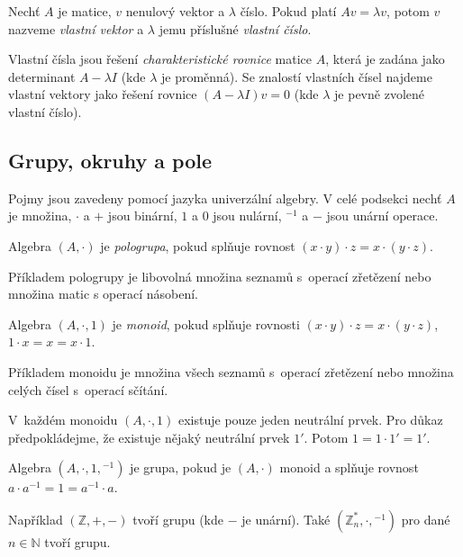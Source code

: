 \begin{definition}
    Nechť $A$ je matice, $v$ nenulový vektor a $\lambda$ číslo.
    Pokud platí $A v = \lambda v$, potom $v$ nazveme {\em vlastní
    vektor} a $\lambda$ jemu příslušné {\em vlastní číslo}.
\end{definition}

Vlastní čísla jsou řešení {\em charakteristické rovnice} matice $A$,
která je zadána jako determinant $A - \lambda I$ (kde $\lambda$ je
proměnná).
Se znalostí vlastních čísel najdeme vlastní vektory jako řešení rovnice
$(A - \lambda I) v = 0$ (kde $\lambda$ je pevně zvolené vlastní číslo).

\subsection{Grupy, okruhy a pole}

Pojmy jsou zavedeny pomocí jazyka univerzální algebry. V celé podsekci
nechť $A$ je množina, $\cdot$ a $+$ jsou binární, $1$ a $0$ jsou
nulární, ${^{-1}}$ a $-$ jsou unární operace.

\begin{definition}[Pologrupa]
    Algebra $(A, \cdot)$ je {\em pologrupa},
    pokud splňuje rovnost
    $(x \cdot y) \cdot z = x \cdot (y \cdot z)$.
\end{definition}

Příkladem pologrupy je libovolná množina seznamů s~operací zřetězení
nebo množina matic s operací násobení.

\begin{definition}[Monoid]
    Algebra $(A, \cdot, 1)$ je {\em monoid}, pokud
    splňuje rovnosti
    $(x \cdot y) \cdot z = x \cdot (y \cdot z)$,
    $1 \cdot x = x = x \cdot 1$.
\end{definition}

Příkladem monoidu je množina všech seznamů s~operací zřetězení nebo
množina celých čísel s~operací sčítání.

V~každém monoidu $(A, \cdot, 1)$ existuje pouze jeden neutrální
prvek. Pro důkaz předpokládejme, že existuje nějaký neutrální prvek $1'$.
Potom $1 = 1 \cdot 1' = 1'$.

\begin{definition}[Grupa]
    Algebra $(A, \cdot, 1, {^{-1}})$ je grupa, pokud
    je $(A, \cdot)$ monoid a splňuje rovnost $a \cdot a^{-1} = 1 = a^{-1} \cdot a$.
\end{definition}

Například $(\mathbb{Z}, +, -)$ tvoří grupu (kde $-$ je unární).
Také $(\mathbb{Z}^*_n, \cdot, {^{-1}})$ pro dané $n \in \mathbb{N}$ tvoří grupu.

